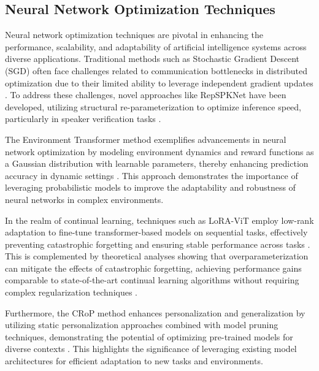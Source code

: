  








\subsection{Neural Network Optimization Techniques} \label{subsec:Neural Network Optimization Techniques}

Neural network optimization techniques are pivotal in enhancing the performance, scalability, and adaptability of artificial intelligence systems across diverse applications. Traditional methods such as Stochastic Gradient Descent (SGD) often face challenges related to communication bottlenecks in distributed optimization due to their limited ability to leverage independent gradient updates \cite{mishchenko201999distributedoptimizationwaste}. To address these challenges, novel approaches like RepSPKNet have been developed, utilizing structural re-parameterization to optimize inference speed, particularly in speaker verification tasks \cite{ma2021repworksspeakerverification}.

The Environment Transformer method exemplifies advancements in neural network optimization by modeling environment dynamics and reward functions as a Gaussian distribution with learnable parameters, thereby enhancing prediction accuracy in dynamic settings \cite{wang2023environmenttransformerpolicyoptimization}. This approach demonstrates the importance of leveraging probabilistic models to improve the adaptability and robustness of neural networks in complex environments.

In the realm of continual learning, techniques such as LoRA-ViT employ low-rank adaptation to fine-tune transformer-based models on sequential tasks, effectively preventing catastrophic forgetting and ensuring stable performance across tasks \cite{chitale2023taskarithmeticloracontinual}. This is complemented by theoretical analyses showing that overparameterization can mitigate the effects of catastrophic forgetting, achieving performance gains comparable to state-of-the-art continual learning algorithms without requiring complex regularization techniques \cite{goldfarb2022analysiscatastrophicforgettingrandom}.

Furthermore, the CRoP method enhances personalization and generalization by utilizing static personalization approaches combined with model pruning techniques, demonstrating the potential of optimizing pre-trained models for diverse contexts \cite{kaur2024cropcontextwiserobuststatic}. This highlights the significance of leveraging existing model architectures for efficient adaptation to new tasks and environments.

